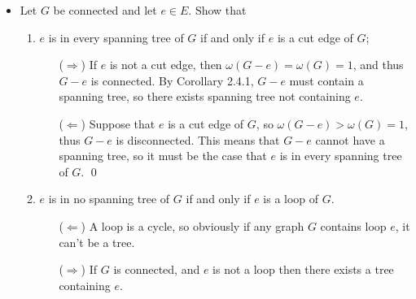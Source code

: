 \documentclass[11pt]{article}
\newcommand\itm[1]{\item[\textbf{#1}]}
\newcommand{\n}{\vspace{0.5cm}}
\begin{document}
\begin{itemize}
\begin{proof}
    \begin{align*}
      2(m+n) - 2 &= 2\nu - 2              & \text{(\(|V_1| + |V_2| = \nu\))}    \\
                 &= 2\varepsilon          & \text{(Theorem 2.2)}                \\
                 &= \sum_{v \in V} d_G(v) & \text{(Theorem 1.1)}                \\
                 &= \sum_{v_1 \in V_1} d_G(v_1) + \sum_{v_2 \in V_2} d_G(v_2)   \\
                 &= 4m + n.               & \text{(\(d_G(C) = 4, d_G(H) = 1\))} \\
    \end{align*}

    Rearranging terms, we get 
    \[2m + 2n - 2 = 4m + n \quad\iff\quad n = 2m + 2.\]
  \end{proof}
  


  \itm{2.2.2} Let \(G\) be connected and let \(e \in E\).  Show that
    \begin{enumerate}[label=(\alph*)]
      \item \(e\) is in every spanning tree of \(G\) if and only if \(e\) is a cut edge of \(G\);
        \begin{enumerate}
          \item[(\(\Rightarrow\))] If \(e\) is not a cut edge, then \(\omega(G-e) = \omega(G) = 1\), and thus \(G-e\) is connected.  By Corollary 2.4.1, \(G-e\) must contain a spanning tree, so there exists spanning tree not containing \(e\). \n

          \item[(\(\Leftarrow\))] Suppose that \(e\) is a cut edge of \(G\), so \(\omega(G-e) > \omega(G) = 1\), thus \(G-e\) is disconnected.  This means that \(G-e\) cannot have a spanning tree, so it must be the case that \(e\) is in every spanning tree of \(G\). \qed \n
        \end{enumerate}

      \item \(e\) is in no spanning tree of \(G\) if and only if \(e\) is a loop of \(G\).
          \begin{enumerate}
            \item[(\(\Leftarrow\))] A loop is a cycle, so obviously if any graph \(G\) contains loop \(e\), it can't be a tree. \n

            \item[(\(\Rightarrow\))] If \(G\) is connected, and \(e\) is not a loop then there exists a tree containing \(e\). \n


\end{enumerate}
\end{enumerate}
\end{itemize}
\end{document}
